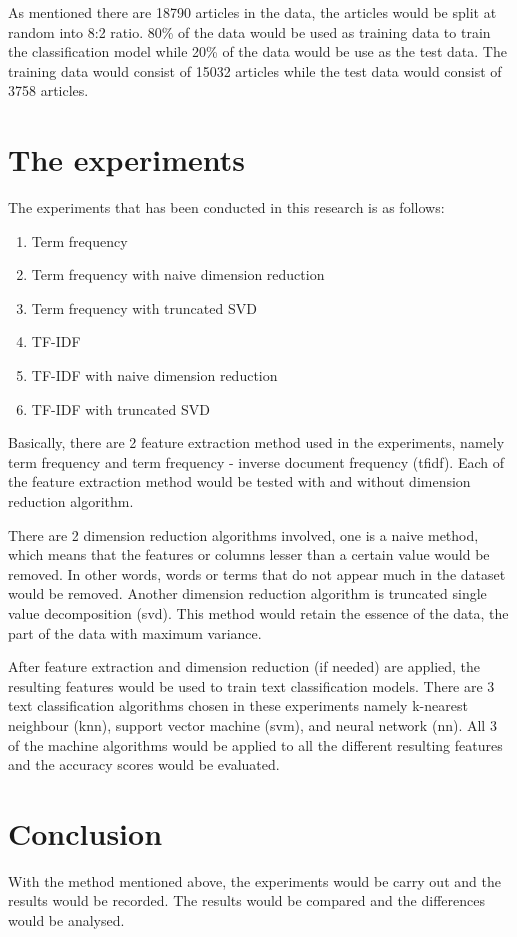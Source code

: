 As mentioned there are 18790 articles in the data, the articles would be split at random into 8:2 ratio. 80\% of the data would be used as training data to train the classification model while 20\% of the data would be use as the test data. The training data would consist of 15032 articles while the test data would consist of 3758 articles.\\


\section{The experiments}
The experiments that has been conducted in this research is as follows:
\begin{enumerate}
	\item Term frequency
	\item Term frequency with naive dimension reduction
	\item Term frequency with truncated SVD
	\item TF-IDF
	\item TF-IDF with naive dimension reduction
	\item TF-IDF with truncated SVD
\end{enumerate}

Basically, there are 2 feature extraction method used in the experiments, namely term frequency and term frequency - inverse document frequency (\ac{tfidf}). Each of the feature extraction method would be tested with and without dimension reduction algorithm.

There are 2 dimension reduction algorithms involved, one is a naive method, which means that the features or columns lesser than a certain value would be removed. In other words, words or terms that do not appear much in the dataset would be removed. Another dimension reduction algorithm is truncated single value decomposition (\ac{svd}). This method would retain the essence of the data, the part of the data with maximum variance. 

After feature extraction and dimension reduction (if needed) are applied, the resulting features would be used to train text classification models. There are 3 text classification algorithms chosen in these experiments namely k-nearest neighbour (\ac{knn}), support vector machine (\ac{svm}), and neural network (\ac{nn}). All 3 of the machine algorithms would be applied to all the different resulting features and the accuracy scores would be evaluated.\\


\section{Conclusion}
With the method mentioned above, the experiments would be carry out and the results would be recorded. The results would be compared and the differences would be analysed.